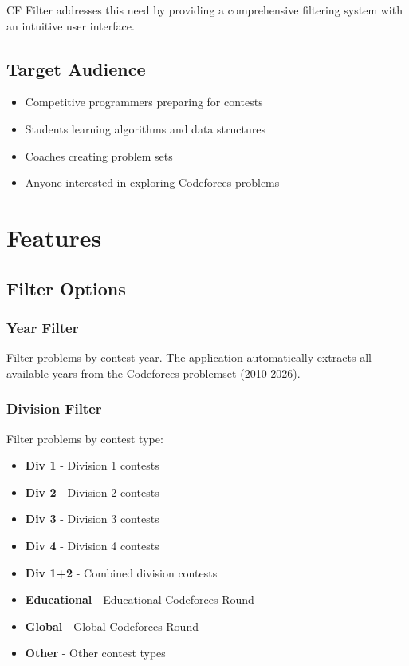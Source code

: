 \documentclass[12pt,a4paper]{article}
\begin{document}
CF Filter addresses this need by providing a comprehensive filtering system with an intuitive user interface.

\subsection{Target Audience}
\begin{itemize}[leftmargin=*]
    \item Competitive programmers preparing for contests
    \item Students learning algorithms and data structures
    \item Coaches creating problem sets
    \item Anyone interested in exploring Codeforces problems
\end{itemize}

\newpage

\section{Features}

\subsection{Filter Options}

\subsubsection{Year Filter}
Filter problems by contest year. The application automatically extracts all available years from the Codeforces problemset (2010-2026).

\subsubsection{Division Filter}
Filter problems by contest type:
\begin{itemize}[leftmargin=*]
    \item \textbf{Div 1} - Division 1 contests
    \item \textbf{Div 2} - Division 2 contests
    \item \textbf{Div 3} - Division 3 contests
    \item \textbf{Div 4} - Division 4 contests
    \item \textbf{Div 1+2} - Combined division contests
    \item \textbf{Educational} - Educational Codeforces Round
    \item \textbf{Global} - Global Codeforces Round
    \item \textbf{Other} - Other contest types
\end{itemize}
\end{document}
